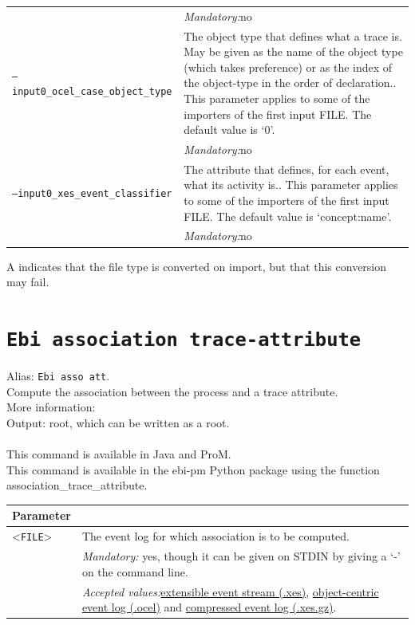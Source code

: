 {\begin{tabularx}{\linewidth}{lX}
&\textit{Mandatory:}\quad no\\
\texttt{--input0\_ocel\_case\_object\_type} & The object type that defines what a trace is. May be given as the name of the object type (which takes preference) or as the index of the object-type in the order of declaration.. This parameter applies to some of the importers of the first input FILE. The default value is `0'.\\
&\textit{Mandatory:}\quad no\\
\texttt{--input0\_xes\_event\_classifier} & The attribute that defines, for each event, what its activity is.. This parameter applies to some of the importers of the first input FILE. The default value is `concept:name'.\\
&\textit{Mandatory:}\quad no\\
\bottomrule
\end{tabularx}
A \textdagger{} indicates that the file type is converted on import, but that this conversion may fail.
\clearpage\section{\texttt{Ebi association trace-attribute}}
\label{command:Ebi association trace-attribute}
Alias: \texttt{Ebi asso att}.\\
Compute the association between the process and a trace attribute.\\
More information: \cite{DBLP:journals/tkde/LeemansMPH23}~\\
\noindent Output: root, which can be written as a root.\\
\\This command is available in Java and ProM.
\\This command is available in the ebi-pm Python package using the function association\_trace\_attribute.
\begin{tabularx}{\linewidth}{lX}
\toprule
Parameter \\\midrule
<\texttt{FILE}>&The event log for which association is to be computed.\\
&\textit{Mandatory:} \quad yes, though it can be given on STDIN by giving a `-' on the command line.\\
&\textit{Accepted values:}\quad \hyperref[filehandler:extensible event stream]{extensible event stream (.xes)}, \hyperref[filehandler:object-centric event log]{object-centric event log (.ocel)} and \hyperref[filehandler:compressed event log]{compressed event log (.xes.gz)}.\\

\end{tabularx}}
